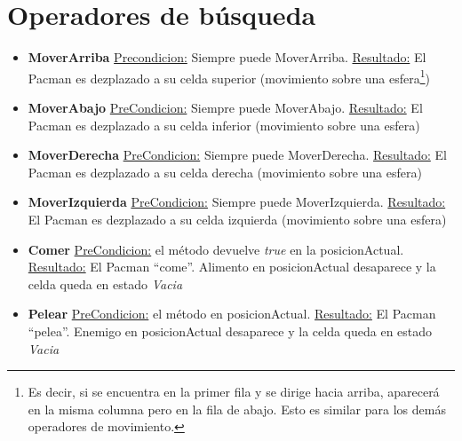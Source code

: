 \section{Operadores de búsqueda}
\begin{itemize}

\item \textbf{MoverArriba}\newline
\underline{Precondicion:} Siempre puede MoverArriba.\newline
\underline{Resultado:} El Pacman es dezplazado a su celda superior (movimiento
sobre una esfera\footnote{Es decir, si se encuentra en la primer fila y se
dirige hacia arriba, aparecerá en la misma columna pero en la fila de abajo.
Esto es similar para los demás operadores de movimiento.})

\item \textbf{MoverAbajo}\newline
\underline{PreCondicion:} Siempre puede MoverAbajo.\newline
\underline{Resultado:} El Pacman es dezplazado a su celda inferior (movimiento
sobre una esfera)

\item \textbf{MoverDerecha}\newline
\underline{PreCondicion:} Siempre puede MoverDerecha.\newline
\underline{Resultado:} El Pacman es dezplazado a su celda derecha (movimiento
sobre una esfera)

\item \textbf{MoverIzquierda}\newline
\underline{PreCondicion:} Siempre puede MoverIzquierda.\newline
\underline{Resultado:} El Pacman es dezplazado a su celda izquierda (movimiento
sobre una esfera)

\item \textbf{Comer}\newline
\underline{PreCondicion:} el método  devuelve \emph{true} en la
posicionActual.\newline
\underline{Resultado:} El Pacman ``come''. Alimento en posicionActual desaparece
y la celda queda en estado \textit{Vacia}

\item \textbf{Pelear}\newline
\underline{PreCondicion:} el método  en
posicionActual.\newline
\underline{Resultado:} El Pacman ``pelea''. Enemigo en posicionActual desaparece
y la celda queda en estado \textit{Vacia}

\end{itemize}
